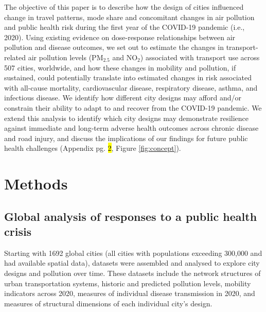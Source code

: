 \documentclass[preprint,10pt]{elsarticle} %
\begin{document}
The objective of this paper is to describe how the design of cities influenced change in travel patterns, mode share and concomitant changes in air pollution and public health risk during the first year of the COVID-19 pandemic (i.e., 2020). Using existing evidence on dose-response relationships between air pollution and disease outcomes, we set out to estimate the changes in transport-related air pollution levels (PM$_{2.5}$ and NO$_{2}$) associated with transport use across 507 cities, worldwide, and how these changes in mobility and pollution, if sustained, could potentially translate into estimated changes in risk associated with all-cause mortality, cardiovascular disease, respiratory disease, asthma, and infectious disease. We identify how different city designs may afford and/or constrain their ability to adapt to and recover from the COVID-19 pandemic. We extend this analysis to identify which city designs may demonstrate resilience against immediate and long-term adverse health outcomes across chronic disease and road injury, and discuss the implications of our findings for future public health challenges (Appendix pg. \hl{2}, Figure \ref{fig:concept}).


\section*{Methods}
\subsection*{Global analysis of responses to a public health crisis}

Starting with 1692 global cities (all cities with populations exceeding 300,000 and had available spatial data\cite{UNDESA2019}), datasets were assembled and analysed to explore city designs and pollution over time. These datasets include the network structures of urban transportation systems, historic and predicted pollution levels, mobility indicators across 2020, measures of individual disease transmission in 2020, and measures of structural dimensions of each individual city's design.
\end{document}

